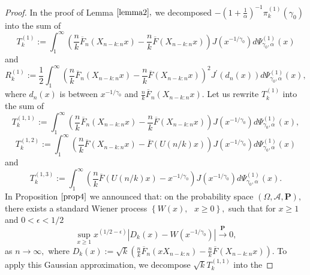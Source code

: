 \documentclass[12pt,reqno,openbib,runningheads,a4paper,portrait]{amsart}%
\begin{document}
\begin{proof}
In the proof of Lemma $\ref{lemma2},$ we decomposed $-\left(  1+\frac
{1}{\alpha}\right)  ^{-1}\pi_{k}^{\left(  1\right)  }\left(  \gamma
_{0}\right)  $ into the sum of%
\[
T_{k}^{\left(  1\right)  }:=\int_{1}^{\infty}\left(  \frac{n}{k}\overline
{F}_{n}\left(  X_{n-k:n}x\right)  -\frac{n}{k}\overline{F}\left(
X_{n-k:n}x\right)  \right)  J\left(  x^{-1/\gamma_{0}}\right)  d\Psi
_{\gamma_{0},\alpha}^{\left(  1\right)  }\left(  x\right)
\]
and%
\[
R_{k}^{\left(  1\right)  }:=\frac{1}{2}\int_{1}^{\infty}\left(  \frac{n}%
{k}\overline{F}_{n}\left(  X_{n-k:n}x\right)  -\frac{n}{k}\overline{F}\left(
X_{n-k:n}x\right)  \right)  ^{2}J^{\prime}\left(  d_{n}\left(  x\right)
\right)  d\Psi_{\gamma_{0},\alpha}^{\left(  1\right)  }\left(  x\right)  ,
\]
where $d_{n}\left(  x\right)  $ is between $x^{-1/\gamma_{0}}$ and $\frac
{n}{k}\overline{F}_{n}\left(  X_{n-k:n}x\right)  .$ Let us rewrite
$T_{k}^{\left(  1\right)  }$ into the sum of%
\[
T_{k}^{\left(  1,1\right)  }:=\int_{1}^{\infty}\left(  \frac{n}{k}\overline
{F}_{n}\left(  X_{n-k:n}x\right)  -\frac{n}{k}\overline{F}\left(
X_{n-k:n}x\right)  \right)  J\left(  x^{-1/\gamma_{0}}\right)  d\Psi
_{\gamma_{0},\alpha}^{\left(  1\right)  }\left(  x\right)  ,
\]%
\[
T_{k}^{\left(  1,2\right)  }:=\int_{1}^{\infty}\left(  \frac{n}{k}\overline
{F}\left(  X_{n-k:n}x\right)  -\overline{F}\left(  U\left(  n/k\right)
x\right)  \right)  J\left(  x^{-1/\gamma_{0}}\right)  d\Psi_{\gamma_{0}%
,\alpha}^{\left(  1\right)  }\left(  x\right)
\]
and%
\[
T_{k}^{\left(  1,3\right)  }:=\int_{1}^{\infty}\left(  \frac{n}{k}\overline
{F}\left(  U\left(  n/k\right)  x\right)  -x^{-1/\gamma_{0}}\right)  J\left(
x^{-1/\gamma_{0}}\right)  d\Psi_{\gamma_{0},\alpha}^{\left(  1\right)
}\left(  x\right)  .
\]
In Proposition $\ref{prop4}$ we announced that: on the probability space
$\left(  \Omega,\mathcal{A},\mathbf{P}\right)  ,$ there exists a standard
Wiener process $\left\{  W\left(  x\right)  ,\text{ }x\geq0\right\}  ,$ such
that for $x\geq1$ and $0<\epsilon<1/2$%
\begin{equation}
\sup_{x\geq1}x^{\left(  1/2-\epsilon\right)  }\left\vert D_{k}\left(
x\right)  -W\left(  x^{-1/\gamma_{0}}\right)  \right\vert \overset{\mathbf{P}%
}{\rightarrow}0, \label{wa}%
\end{equation}
as $n\rightarrow\infty,$ where $D_{k}\left(  x\right)  :=\sqrt{k}\left(
\frac{n}{k}\overline{F}_{n}\left(  xX_{n-k:n}\right)  -\frac{n}{k}\overline
{F}\left(  X_{n-k:n}x\right)  \right)  .$ To apply this Gaussian
approximation, we decompose $\sqrt{k}T_{k}^{\left(  1,1\right)  }$ into the

\end{proof}
\end{document}
